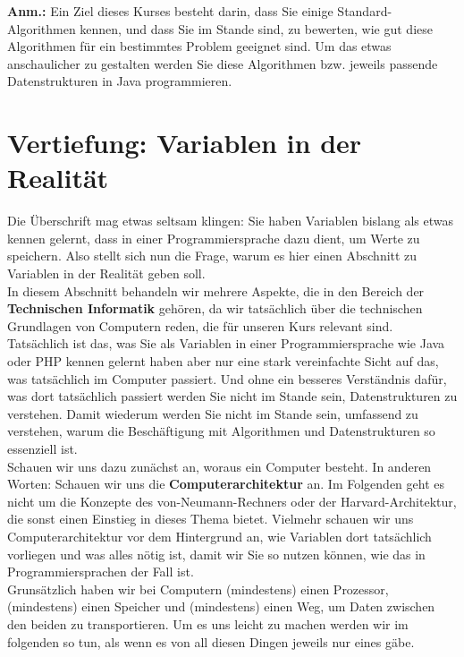 \textbf{Anm.:} Ein Ziel dieses Kurses besteht darin, dass Sie einige Standard-\\Algorithmen kennen, und dass Sie im Stande sind, zu bewerten, wie gut diese Algorithmen für ein bestimmtes Problem geeignet sind. Um das etwas anschaulicher zu gestalten werden Sie diese Algorithmen bzw. jeweils passende Datenstrukturen in Java programmieren.

\section{Vertiefung: Variablen in der Realität}

Die Überschrift mag etwas seltsam klingen: Sie haben Variablen bislang als etwas kennen gelernt, dass in einer Programmiersprache dazu dient, um Werte zu speichern. Also stellt sich nun die Frage, warum es hier einen Abschnitt zu Variablen \glqq{}in der Realität\grqq{} geben soll.\\

In diesem Abschnitt behandeln wir mehrere Aspekte, die in den Bereich der \textbf{Technischen Informatik} gehören, da wir tatsächlich über die technischen Grundlagen von Computern reden, die für unseren Kurs relevant sind.\\

Tatsächlich ist das, was Sie als Variablen in einer Programmiersprache wie Java oder PHP kennen gelernt haben aber nur eine stark vereinfachte Sicht auf das, was tatsächlich im Computer passiert. Und ohne ein besseres Verständnis dafür, was dort tatsächlich passiert werden Sie nicht im Stande sein, Datenstrukturen zu verstehen. Damit wiederum werden Sie nicht im Stande sein, umfassend zu verstehen, warum die Beschäftigung mit Algorithmen und Datenstrukturen so essenziell ist.\\

Schauen wir uns dazu zunächst an, woraus ein Computer besteht. In anderen Worten: Schauen wir uns die \textbf{Computerarchitektur} an. Im Folgenden geht es nicht um die Konzepte des von-Neumann-Rechners oder der Harvard-Architektur, die sonst einen Einstieg in dieses Thema bietet. Vielmehr schauen wir uns Computerarchitektur vor dem Hintergrund an, wie Variablen dort tatsächlich vorliegen und was alles nötig ist, damit wir Sie so nutzen können, wie das in Programmiersprachen der Fall ist.\\

Grunsätzlich haben wir bei Computern (mindestens) einen Prozessor, (mindestens) einen Speicher und (mindestens) einen Weg, um Daten zwischen den beiden zu transportieren. Um es uns leicht zu machen werden wir im folgenden so tun, als wenn es von all diesen Dingen jeweils nur eines gäbe.\\

